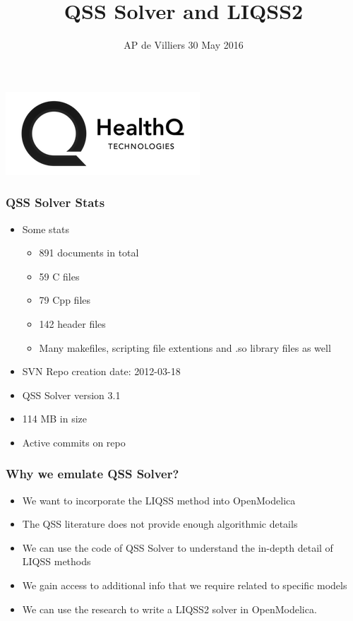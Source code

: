 \documentclass[serif,10pt,t]{beamer}
\begin{document}
\title[{QSS Solver and LIQSS2 \hspace{0.4cm} \insertframenumber/\inserttotalframenumber}]{{\sc QSS Solver and LIQSS2}}
\author[AP de Villiers]{{AP de Villiers} \newline \newline \footnotesize 30 May 2016}
\date{}

\begin{frame}
\begin{center}
\vspace{0.1cm}
\includegraphics[scale=1]{HQLogo.png}
\end{center}
\titlepage
\end{frame}




\begin{frame}\frametitle{QSS Solver Stats}
\begin{itemize}
\item Some stats
\begin{itemize}
\item 891 documents in total
\item 59 C files
\item 79 Cpp files
\item 142 header files
\item Many makefiles, scripting file extentions and .so library files as well
\end{itemize}
\item SVN Repo creation date: 2012-03-18
\item QSS Solver version 3.1
\item 114 MB in size
\item Active commits on repo
\end{itemize}

\end{frame}


\begin{frame}\frametitle{Why we emulate QSS Solver?}
 \begin{itemize}
  \item We want to incorporate the LIQSS method into OpenModelica
  \item The QSS literature does not provide enough algorithmic details
  \item We can use the code of QSS Solver to understand the in-depth detail of LIQSS methods
  \item We gain access to additional info that we require related to specific models
  \item We can use the research to write a LIQSS2 solver in OpenModelica.
 \end{itemize}
\end{frame}
\end{document}
